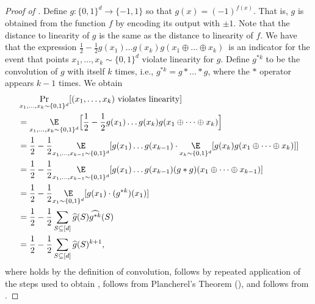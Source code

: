 \documentclass{toc}
\begin{document}
\begin{proof}[Proof of ]
    Define $g \colon \{0,1\}^d \to \{-1, 1\}$ so that $g(x) = (-1)^{f(x)}$.
   That is, $g$ is obtained from the function $f$ by encoding its output with $\pm 1$.  Note that the distance to linearity of $g$ is the same as the distance to linearity of $f$. 
   We have that the expression $\frac{1}{2} - \frac{1}{2}g(x_1)\dots g(x_k)g(x_1 \oplus \dots \oplus x_k)$~is an indicator for the event that 
   points $x_1, \dots, x_k\sim \{0,1\}^d$ violate linearity 
   for $g$. Define $g^{*k}$ to be the convolution of $g$ with itself $k$ times, i.e., $g^{*k} = g * \dots * g$, where the $*$ operator appears $k-1$ times.  We obtain
  \begin{align}
      &\Pr_{x_1, \dots, x_k \sim \{0,1\}^d}[(x_1, \dots, x_k) \textnormal{ violates linearity}]\nonumber \\
      &= \underset{x_1, \dots, x_k \sim \{0,1\}^d}{\E} \Big[\frac{1}{2} - \frac{1}{2}g(x_1)\dots g(x_k)g(x_1 \oplus \dots \oplus x_k)\Big] \nonumber \\
      &= \frac{1}{2} - \frac{1}{2} \underset{x_1 , \dots, x_{k-1} \sim \{0,1\}^d}{\E} [g(x_1) \dots g(x_{k-1}) \cdot \underset{x_k \sim \{0,1\}^d}{\E} [g(x_k) g(x_1 \oplus \dots \oplus x_k)]]
      \nonumber  \\
      &= \frac{1}{2} - \frac{1}{2} \underset{x_1 , \dots, x_{k-1} \sim \{0,1\}^d}{\E} [g(x_1) \dots g(x_{k-1}) (g * g)(x_1\oplus \dots \oplus x_{k-1})]
      \label{eq:definition} \\
      &= \frac{1}{2} - \frac{1}{2} \underset{x_1 \sim \{0,1\}^d}{\E} [g(x_1) \cdot (g^{*k})(x_1)]  \label{eq:repeat} \\
      &=  \frac{1}{2} - \frac{1}{2}\sum_{S \subseteq [d]} \widehat{g}(S) \widehat{g^{*k}}(S) \label{eq:plancherel}\\ 
      &=  \frac{1}{2} - \frac{1}{2} \sum_{S \subseteq [d]} \widehat{g}(S)^{k+1}, \label{eq:convolution}
  \end{align}
  where   holds by the definition of convolution,  follows by repeated application of the steps used to obtain ,   follows from Plancherel’s Theorem (), and   follows from .
  

\end{proof}
\end{document}
